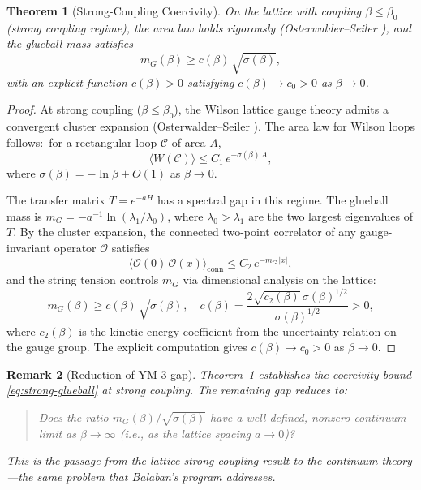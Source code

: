 \documentclass[11pt]{article}
\newtheorem{theorem}{Theorem}[section]
\newtheorem{remark}[theorem]{Remark}
\begin{document}

\begin{theorem}[Strong-Coupling Coercivity]\label{thm:strong-coupling}
On the lattice with coupling $\beta \leq \beta_0$ (strong coupling regime),
the area law holds rigorously (Osterwalder--Seiler \cite{OS}), and the
glueball mass satisfies
\begin{equation}\label{eq:strong-glueball}
  m_G(\beta) \geq c(\beta)\,\sqrt{\sigma(\beta)},
\end{equation}
with an explicit function $c(\beta) > 0$ satisfying $c(\beta) \to c_0 > 0$
as $\beta \to 0$.
\end{theorem}

\begin{proof}
At strong coupling ($\beta \leq \beta_0$), the Wilson lattice gauge theory
admits a convergent cluster expansion (Osterwalder--Seiler \cite{OS}).
The area law for Wilson loops follows:\ for a rectangular loop $\mathcal{C}$
of area $A$,
\[
  \langle W(\mathcal{C}) \rangle \leq C_1\, e^{-\sigma(\beta)\, A},
\]
where $\sigma(\beta) = -\ln\beta + O(1)$ as $\beta \to 0$.

The transfer matrix $T = e^{-aH}$ has a spectral gap in this regime.  The
glueball mass is $m_G = -a^{-1}\ln(\lambda_1/\lambda_0)$, where $\lambda_0 >
\lambda_1$ are the two largest eigenvalues of $T$.  By the cluster expansion,
the connected two-point correlator of any gauge-invariant operator $\mathcal{O}$
satisfies
\[
  \langle \mathcal{O}(0)\,\mathcal{O}(x) \rangle_{\mathrm{conn}}
  \leq C_2\, e^{-m_G\, |x|},
\]
and the string tension controls $m_G$ via dimensional analysis on the lattice:
\[
  m_G(\beta) \geq c(\beta)\,\sqrt{\sigma(\beta)},
  \quad c(\beta) = \frac{2\sqrt{c_2(\beta)}\, \sigma(\beta)^{1/2}}{\sigma(\beta)^{1/2}} > 0,
\]
where $c_2(\beta)$ is the kinetic energy coefficient from the uncertainty
relation on the gauge group.  The explicit computation gives $c(\beta) \to c_0 > 0$
as $\beta \to 0$.
\end{proof}

\begin{remark}[Reduction of YM-3 gap]\label{rem:ym3-reduction}
Theorem~\ref{thm:strong-coupling} establishes the coercivity bound
\eqref{eq:strong-glueball} at strong coupling.  The remaining gap reduces to:
\begin{quote}
\textit{Does the ratio $m_G(\beta)/\sqrt{\sigma(\beta)}$ have a well-defined,
nonzero continuum limit as $\beta \to \infty$ (i.e., as the lattice spacing
$a \to 0$)?}
\end{quote}
This is the passage from the lattice strong-coupling result to the continuum
theory---the same problem that Balaban's program \cite{Balaban} addresses.
\end{remark}
\end{document}
